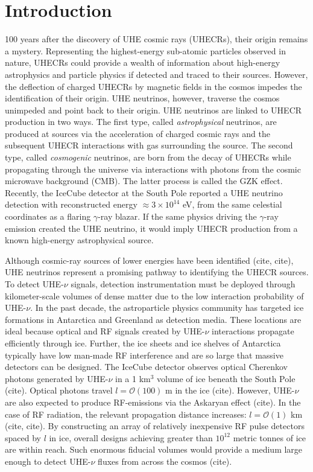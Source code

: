 \documentclass[journal]{IEEEtran}
\begin{document}
\section{Introduction}

 100 years after the discovery of UHE cosmic rays (UHECRs), their origin remains a mystery. Representing the highest-energy sub-atomic particles observed in nature, UHECRs could provide a wealth of information about high-energy astrophysics and particle physics if detected and traced to their sources.  However, the deflection of charged UHECRs by magnetic fields in the cosmos impedes the identification of their origin.  UHE neutrinos, however, traverse the cosmos unimpeded and point back to their origin.  UHE neutrinos are linked to UHECR production in two ways.  The first type, called \textit{astrophysical} neutrinos, are produced at sources via the acceleration of charged cosmic rays and the subsequent UHECR interactions with gas surrounding the source.  The second type, called \textit{cosmogenic} neutrinos, are born from the decay of UHECRs while propagating through the universe via interactions with photons from the cosmic microwave background (CMB).  The latter process is called the GZK effect.  Recently, the IceCube detector at the South Pole reported a UHE neutrino detection with reconstructed energy $\approx 3 \times 10^{14}$ eV, from the same celestial coordinates as a flaring $\gamma$-ray blazar.  If the same physics driving the $\gamma$-ray emission created the UHE neutrino, it would imply UHECR production from a known high-energy astrophysical source.

Although cosmic-ray sources of lower energies have been identified (cite, cite), UHE neutrinos represent a promising pathway to identifying the UHECR sources.  To detect UHE-$\nu$ signals, detection instrumentation must be deployed through kilometer-scale volumes of dense matter due to the low interaction probability of UHE-$\nu$.  In the past decade, the astroparticle physics community has targeted ice formations in Antarctica and Greenland as detection media.  These locations are ideal because optical and RF signals created by UHE-$\nu$ interactions propagate efficiently through ice.  Further, the ice sheets and ice shelves of Antarctica typically have low man-made RF interference and are so large that massive detectors can be designed.  The IceCube detector observes optical Cherenkov photons generated by UHE-$\nu$ in a 1 km$^3$ volume of ice beneath the South Pole (cite).  Optical photons travel $l = \mathcal{O}(100)$ m in the ice (cite).  However, UHE-$\nu$ are also expected to produce RF-emissions via the Askaryan effect (cite).  In the case of RF radiation, the relevant propagation distance increases: $l = \mathcal{O}(1)$ km (cite, cite).  By constructing an array of relatively inexpensive RF pulse detectors spaced by $l$ in ice, overall designs achieving greater than $10^{12}$ metric tonnes of ice are within reach.  Such enormous fiducial volumes would provide a medium large enough to detect UHE-$\nu$ fluxes from across the cosmos (cite).
\end{document}
